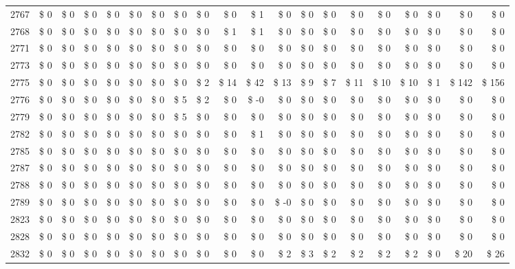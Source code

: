 \begin{longtable}{lrrrrrrrrrrrrrrrrrrr}
2767 & \$ 0 & \$ 0 & \$ 0 & \$ 0 & \$ 0 & \$ 0 & \$ 0 & \$ 0 & \$ 0 & \$ 1 & \$ 0 & \$ 0 & \$ 0 & \$ 0 & \$ 0 & \$ 0 & \$ 0 & \$ 0 & \$ 0 \\
2768 & \$ 0 & \$ 0 & \$ 0 & \$ 0 & \$ 0 & \$ 0 & \$ 0 & \$ 0 & \$ 1 & \$ 1 & \$ 0 & \$ 0 & \$ 0 & \$ 0 & \$ 0 & \$ 0 & \$ 0 & \$ 0 & \$ 0 \\
2771 & \$ 0 & \$ 0 & \$ 0 & \$ 0 & \$ 0 & \$ 0 & \$ 0 & \$ 0 & \$ 0 & \$ 0 & \$ 0 & \$ 0 & \$ 0 & \$ 0 & \$ 0 & \$ 0 & \$ 0 & \$ 0 & \$ 0 \\
2773 & \$ 0 & \$ 0 & \$ 0 & \$ 0 & \$ 0 & \$ 0 & \$ 0 & \$ 0 & \$ 0 & \$ 0 & \$ 0 & \$ 0 & \$ 0 & \$ 0 & \$ 0 & \$ 0 & \$ 0 & \$ 0 & \$ 0 \\
2775 & \$ 0 & \$ 0 & \$ 0 & \$ 0 & \$ 0 & \$ 0 & \$ 0 & \$ 2 & \$ 14 & \$ 42 & \$ 13 & \$ 9 & \$ 7 & \$ 11 & \$ 10 & \$ 10 & \$ 1 & \$ 142 & \$ 156 \\
2776 & \$ 0 & \$ 0 & \$ 0 & \$ 0 & \$ 0 & \$ 0 & \$ 5 & \$ 2 & \$ 0 & \$ -0 & \$ 0 & \$ 0 & \$ 0 & \$ 0 & \$ 0 & \$ 0 & \$ 0 & \$ 0 & \$ 0 \\
2779 & \$ 0 & \$ 0 & \$ 0 & \$ 0 & \$ 0 & \$ 0 & \$ 5 & \$ 0 & \$ 0 & \$ 0 & \$ 0 & \$ 0 & \$ 0 & \$ 0 & \$ 0 & \$ 0 & \$ 0 & \$ 0 & \$ 0 \\
2782 & \$ 0 & \$ 0 & \$ 0 & \$ 0 & \$ 0 & \$ 0 & \$ 0 & \$ 0 & \$ 0 & \$ 1 & \$ 0 & \$ 0 & \$ 0 & \$ 0 & \$ 0 & \$ 0 & \$ 0 & \$ 0 & \$ 0 \\
2785 & \$ 0 & \$ 0 & \$ 0 & \$ 0 & \$ 0 & \$ 0 & \$ 0 & \$ 0 & \$ 0 & \$ 0 & \$ 0 & \$ 0 & \$ 0 & \$ 0 & \$ 0 & \$ 0 & \$ 0 & \$ 0 & \$ 0 \\
2787 & \$ 0 & \$ 0 & \$ 0 & \$ 0 & \$ 0 & \$ 0 & \$ 0 & \$ 0 & \$ 0 & \$ 0 & \$ 0 & \$ 0 & \$ 0 & \$ 0 & \$ 0 & \$ 0 & \$ 0 & \$ 0 & \$ 0 \\
2788 & \$ 0 & \$ 0 & \$ 0 & \$ 0 & \$ 0 & \$ 0 & \$ 0 & \$ 0 & \$ 0 & \$ 0 & \$ 0 & \$ 0 & \$ 0 & \$ 0 & \$ 0 & \$ 0 & \$ 0 & \$ 0 & \$ 0 \\
2789 & \$ 0 & \$ 0 & \$ 0 & \$ 0 & \$ 0 & \$ 0 & \$ 0 & \$ 0 & \$ 0 & \$ 0 & \$ -0 & \$ 0 & \$ 0 & \$ 0 & \$ 0 & \$ 0 & \$ 0 & \$ 0 & \$ 0 \\
2823 & \$ 0 & \$ 0 & \$ 0 & \$ 0 & \$ 0 & \$ 0 & \$ 0 & \$ 0 & \$ 0 & \$ 0 & \$ 0 & \$ 0 & \$ 0 & \$ 0 & \$ 0 & \$ 0 & \$ 0 & \$ 0 & \$ 0 \\
2828 & \$ 0 & \$ 0 & \$ 0 & \$ 0 & \$ 0 & \$ 0 & \$ 0 & \$ 0 & \$ 0 & \$ 0 & \$ 0 & \$ 0 & \$ 0 & \$ 0 & \$ 0 & \$ 0 & \$ 0 & \$ 0 & \$ 0 \\
2832 & \$ 0 & \$ 0 & \$ 0 & \$ 0 & \$ 0 & \$ 0 & \$ 0 & \$ 0 & \$ 0 & \$ 0 & \$ 2 & \$ 3 & \$ 2 & \$ 2 & \$ 2 & \$ 2 & \$ 0 & \$ 20 & \$ 26 \\

\end{longtable}
